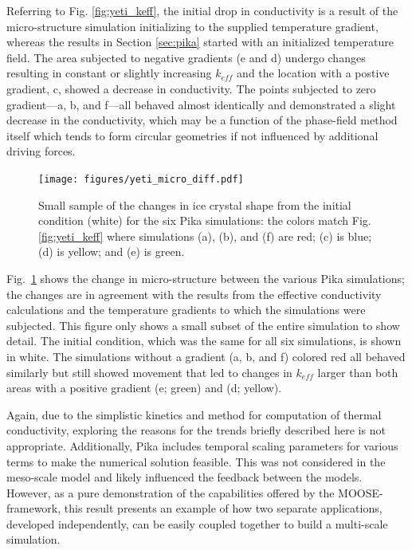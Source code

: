 Referring to Fig. \ref{fig:yeti_keff}, the initial drop in conductivity is a result of the micro-structure simulation initializing to the supplied temperature gradient, whereas the results in Section \ref{sec:pika} started with an initialized temperature field. The area subjected to negative gradients (e and d) undergo changes resulting in constant or slightly increasing $k_{eff}$ and the location with a postive gradient, c, showed a decrease in conductivity. The points subjected to zero gradient---a, b, and f---all behaved almost identically and demonstrated a slight decrease in the conductivity, which may be a function of the phase-field method itself which tends to form circular geometries if not influenced by additional driving forces.

\begin{figure}[t]
  \texttt{[image: figures/yeti\_micro\_diff.pdf]}
  \caption{Small sample of the changes in ice crystal shape from the initial condition (white) for the six Pika simulations: the colors match Fig. \ref{fig:yeti_keff} where simulations (a), (b), and (f) are red; (c) is blue; (d) is yellow; and (e) is green.}
  \label{fig:yeti_micro}
\end{figure}

Fig.~\ref{fig:yeti_micro} shows the change in micro-structure between the various Pika simulations; the changes are in agreement with the results from the effective conductivity calculations and the temperature gradients to which the simulations were subjected. This figure only shows a small subset of the entire simulation to show detail. The initial condition, which was the same for all six simulations, is shown in white. The simulations without a gradient (a, b, and f) colored red all behaved similarly but still showed movement that led to changes in $k_{eff}$ larger than both areas with a positive gradient (e; green) and (d; yellow).

Again, due to the simplistic kinetics and method for computation of thermal conductivity, exploring the reasons for the trends briefly described here is not appropriate. Additionally, Pika includes temporal scaling parameters for various terms to make the numerical solution feasible. This was not considered in the meso-scale model and likely influenced the feedback between the models. However, as a pure demonstration of the capabilities offered by the MOOSE-framework, this result presents an example of how two separate applications, developed independently, can be easily coupled together to build a multi-scale simulation.



